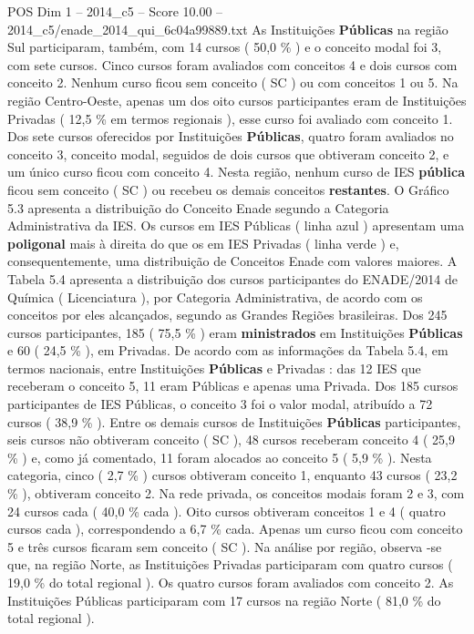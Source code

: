 \begin{textsample}{POS Dim 1 – 2014\_c5 – Score 10.00 – 2014\_c5/enade\_2014\_qui\_6c04a99889.txt}
As Instituições \textbf{Públicas} na região Sul participaram, também, com 14 cursos ( 50,0 \% ) e o conceito modal foi 3, com sete cursos.
Cinco cursos foram avaliados com conceitos 4 e dois cursos com conceito 2.
Nenhum curso ficou sem conceito ( SC ) ou com conceitos 1 ou 5.
Na região Centro-Oeste, apenas um dos oito cursos participantes eram de Instituições Privadas ( 12,5 \% em termos regionais ), esse curso foi avaliado com conceito 1.
Dos sete cursos oferecidos por Instituições \textbf{Públicas}, quatro foram avaliados no conceito 3, conceito modal, seguidos de dois cursos que obtiveram conceito 2, e um único curso ficou com conceito 4.
Nesta região, nenhum curso de IES \textbf{pública} ficou sem conceito ( SC ) ou recebeu os demais conceitos \textbf{restantes}.
O Gráfico 5.3 apresenta a distribuição do Conceito Enade segundo a Categoria Administrativa da IES.
Os cursos em IES Públicas ( linha azul ) apresentam uma \textbf{poligonal} mais à direita do que os em IES Privadas ( linha verde ) e, consequentemente, uma distribuição de Conceitos Enade com valores maiores.
A Tabela 5.4 apresenta a distribuição dos cursos participantes do ENADE/2014 de Química ( Licenciatura ), por Categoria Administrativa, de acordo com os conceitos por eles alcançados, segundo as Grandes Regiões brasileiras.
Dos 245 cursos participantes, 185 ( 75,5 \% ) eram \textbf{ministrados} em Instituições \textbf{Públicas} e 60 ( 24,5 \% ), em Privadas.
De acordo com as informações da Tabela 5.4, em termos nacionais, entre Instituições \textbf{Públicas} e Privadas : das 12 IES que receberam o conceito 5, 11 eram Públicas e apenas uma Privada.
Dos 185 cursos participantes de IES Públicas, o conceito 3 foi o valor modal, atribuído a 72 cursos ( 38,9 \% ).
Entre os demais cursos de Instituições \textbf{Públicas} participantes, seis cursos não obtiveram conceito ( SC ), 48 cursos receberam conceito 4 ( 25,9 \% ) e, como já comentado, 11 foram alocados ao conceito 5 ( 5,9 \% ).
Nesta categoria, cinco ( 2,7 \% ) cursos obtiveram conceito 1, enquanto 43 cursos ( 23,2 \% ), obtiveram conceito 2.
Na rede privada, os conceitos modais foram 2 e 3, com 24 cursos cada ( 40,0 \% cada ).
Oito cursos obtiveram conceitos 1 e 4 ( quatro cursos cada ), correspondendo a 6,7 \% cada.
Apenas um curso ficou com conceito 5 e três cursos ficaram sem conceito ( SC ).
Na análise por região, observa -se que, na região Norte, as Instituições Privadas participaram com quatro cursos ( 19,0 \% do total regional ).
Os quatro cursos foram avaliados com conceito 2.
As Instituições Públicas participaram com 17 cursos na região Norte ( 81,0 \% do total regional ).

\end{textsample}
